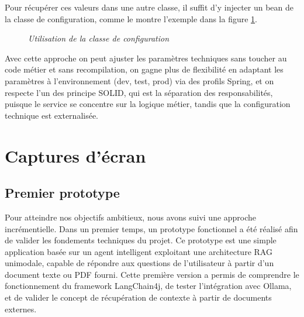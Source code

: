 \documentclass[12pt,a4paper]{report}
\begin{document}
	Pour récupérer ces valeurs dans une autre classe, il suffit d'y injecter un bean de la classe de configuration, comme le montre l'exemple dans la figure \ref{fig:using-configuration-property-value}.
	
	\begin{figure}[H]
		\centering
		\caption{\textit{Utilisation de la classe de configuration}}
		\label{fig:using-configuration-property-value}
	\end{figure}
	
	Avec cette approche on peut ajuster les paramètres techniques sans toucher au code métier et sans recompilation, on gagne plus de flexibilité en adaptant les paramètres à l'environnement (dev, test, prod) via des profils Spring, et on respecte l'un des principe SOLID, qui est la séparation des responsabilités, puisque le service se concentre sur la logique métier, tandis que la configuration technique est externalisée.
	
	\section{Captures d'écran}
	
	
	
	\subsection{Premier prototype}
	
	Pour atteindre nos objectifs ambitieux, nous avons suivi une approche incrémentielle. Dans un premier temps, un prototype fonctionnel a été réalisé afin de valider les fondements techniques du projet. Ce prototype est une simple application basée sur un agent intelligent exploitant une architecture RAG unimodale, capable de répondre aux questions de l’utilisateur à partir d’un document texte ou PDF fourni. Cette première version a permis de comprendre le fonctionnement du framework LangChain4j, de tester l’intégration avec Ollama, et de valider le concept de récupération de contexte à partir de documents externes.
	
\end{document}
